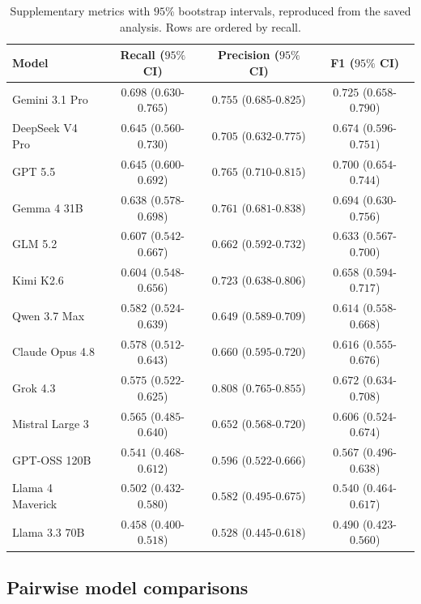 \documentclass[11pt,a4paper]{article}
\begin{document}
\begin{table}[t]
\centering\small
\caption{Supplementary metrics with $95$\% bootstrap intervals, reproduced from the saved analysis. Rows are ordered by recall.}
\label{tab:prf-supplement}
\begin{tabular}{@{}lccc@{}}
\toprule
Model & Recall ($95\%$ CI) & Precision ($95\%$ CI) & F1 ($95\%$ CI)\\
\midrule
Gemini 3.1 Pro & $0.698$ ($0.630$-$0.765$) & $0.755$ ($0.685$-$0.825$) & $0.725$ ($0.658$-$0.790$)\\
DeepSeek V4 Pro & $0.645$ ($0.560$-$0.730$) & $0.705$ ($0.632$-$0.775$) & $0.674$ ($0.596$-$0.751$)\\
GPT 5.5 & $0.645$ ($0.600$-$0.692$) & $0.765$ ($0.710$-$0.815$) & $0.700$ ($0.654$-$0.744$)\\
Gemma 4 31B & $0.638$ ($0.578$-$0.698$) & $0.761$ ($0.681$-$0.838$) & $0.694$ ($0.630$-$0.756$)\\
GLM 5.2 & $0.607$ ($0.542$-$0.667$) & $0.662$ ($0.592$-$0.732$) & $0.633$ ($0.567$-$0.700$)\\
Kimi K2.6 & $0.604$ ($0.548$-$0.656$) & $0.723$ ($0.638$-$0.806$) & $0.658$ ($0.594$-$0.717$)\\
Qwen 3.7 Max & $0.582$ ($0.524$-$0.639$) & $0.649$ ($0.589$-$0.709$) & $0.614$ ($0.558$-$0.668$)\\
Claude Opus 4.8 & $0.578$ ($0.512$-$0.643$) & $0.660$ ($0.595$-$0.720$) & $0.616$ ($0.555$-$0.676$)\\
Grok 4.3 & $0.575$ ($0.522$-$0.625$) & $0.808$ ($0.765$-$0.855$) & $0.672$ ($0.634$-$0.708$)\\
Mistral Large 3 & $0.565$ ($0.485$-$0.640$) & $0.652$ ($0.568$-$0.720$) & $0.606$ ($0.524$-$0.674$)\\
GPT-OSS 120B & $0.541$ ($0.468$-$0.612$) & $0.596$ ($0.522$-$0.666$) & $0.567$ ($0.496$-$0.638$)\\
Llama 4 Maverick & $0.502$ ($0.432$-$0.580$) & $0.582$ ($0.495$-$0.675$) & $0.540$ ($0.464$-$0.617$)\\
Llama 3.3 70B & $0.458$ ($0.400$-$0.518$) & $0.528$ ($0.445$-$0.618$) & $0.490$ ($0.423$-$0.560$)\\
\bottomrule
\end{tabular}
\end{table}

\subsection{Pairwise model comparisons}
\label{app:pairwise_results}
\end{document}
